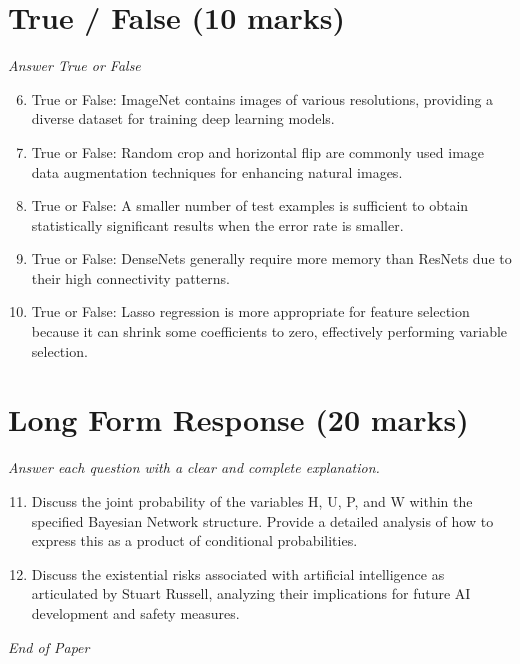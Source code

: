 \documentclass[12pt]{article}
\begin{document}
\section*{True / False (10 marks)}
\textit{Answer True or False}
\begin{enumerate}[label=\arabic*.]
\setcounter{enumi}{5}
\item True or False: ImageNet contains images of various resolutions, providing a diverse dataset for training deep learning models.
\item True or False: Random crop and horizontal flip are commonly used image data augmentation techniques for enhancing natural images.
\item True or False: A smaller number of test examples is sufficient to obtain statistically significant results when the error rate is smaller.
\item True or False: DenseNets generally require more memory than ResNets due to their high connectivity patterns.
\item True or False: Lasso regression is more appropriate for feature selection because it can shrink some coefficients to zero, effectively performing variable selection.
\end{enumerate}

\section*{Long Form Response (20 marks)}
\textit{Answer each question with a clear and complete explanation.}
\begin{enumerate}[label=\arabic*.]
\setcounter{enumi}{10}
\item Discuss the joint probability of the variables H, U, P, and W within the specified Bayesian Network structure. Provide a detailed analysis of how to express this as a product of conditional probabilities.
\item Discuss the existential risks associated with artificial intelligence as articulated by Stuart Russell, analyzing their implications for future AI development and safety measures.
\end{enumerate}

\vfill
\noindent\textit{End of Paper}
\end{document}
